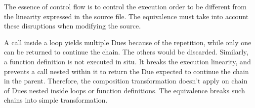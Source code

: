 \begin{figure}[h!]
\end{figure}

The essence of control flow is to control the execution order to be different from the linearity expressed in the source file.
The equivalence must take into account these disruptions when modifying the source.

A call inside a loop yields multiple Dues because of the repetition, while only one can be returned to continue the chain.
The others would be discarded.
Similarly, a function definition is not executed in situ.
It breaks the execution linearity, and prevents a call nested within it to return the Due expected to continue the chain in the parent.
Therefore, the composition transformation doesn't apply on chain of Dues nested inside loops or function definitions.
The equivalence breaks such chains into simple transformation.

